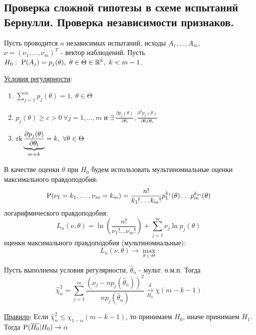 \subsection{Проверка сложной гипотезы в схеме испытаний Бернулли. Проверка независимости признаков.}
Пусть проводится $n$ независимых испытаний, исходы
$A_1,\ldots,A_m$, $\nu=(\nu_1,\ldots,\nu_m)^T$ - вектор наблюдений.
Пусть $H_0:\ \P(A_j)=p_j(\theta),\ \theta\in\Theta\in\R^k,\ k<m-1$.

\underline{Условия регулярности}:
\begin{enumerate}
    \item $\sum_{j=1}^mp_j(\theta)=1,\ \theta\in\Theta$
    \item $p_j(\theta)\geq c>0\ \forall j=1,\ldots,m$ и $\exists\ \frac{\partial p_j(\theta)}{\partial \theta_l},\frac{\partial^2p_j(\theta)}{\partial\theta_l\partial\theta_r}$
    \item $\rk\underbrace{\frac{\partial p_j(\theta)}{\partial \theta_l}}_{m\times k}=k,\ \forall\theta\in\Theta$
\end{enumerate}
В качестве оценки $\theta$ при $H_0$ будем использовать мультиномиальные
оценки максимального правдоподобия:
\[\P(\nu_1=k_1,\ldots,\nu_m=k_m)=\frac{n!}{k_1!\ldots k_m!}p_1^{k_1}(\theta)\ldots p_m^{k_m}(\theta)\]
логарифмического правдоподобия:
\[L_n(\nu,\theta)=\ln\left(\frac{n!}{\nu_1!\ldots \nu_m!}\right)+\sum_{j=1}^m\nu_j\ln p_j(\theta)\]
оценки максимального правдоподобия (мультиномиальные):
\[L_n(\nu,\theta)\rightarrow\max_{\theta\in\Theta}\]
\begin{theorem*}
Пусть выполнены условия регулярности, $\widehat{\theta}_n$ - мульт. о.м.п. Тогда
\[ \widehat{\chi}_n^2=\sum_{j=1}^m\frac{(\nu_j-np_j(\widehat{\theta}_n))^2}{np_j(\widehat{\theta}_n)}\xrightarrow[H_0]{d}\chi(m-k-1) \]

\underline{Правило}: Если $\widehat{\chi}_n^2\leq\chi_{1-\alpha}(m-k-1)$, то принимаем $H_0$, иначе принимаем $H_1$.
Тогда $\P(\overline{H_0}\vert H_0)\rightarrow\alpha$

\end{theorem*}
